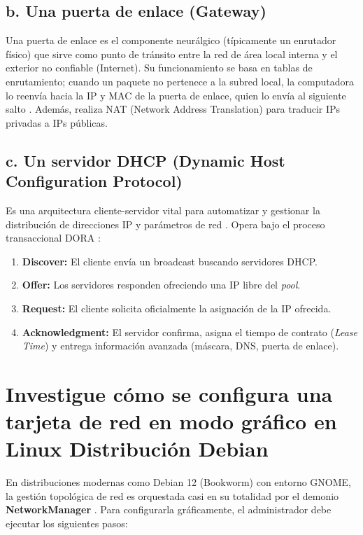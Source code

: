 \documentclass[a4paper,12pt]{article}
\begin{document}
\subsection*{b. Una puerta de enlace (Gateway)}
Una puerta de enlace es el componente neurálgico (típicamente un enrutador físico) que sirve como punto de tránsito entre la red de área local interna y el exterior no confiable (Internet). Su funcionamiento se basa en tablas de enrutamiento; cuando un paquete no pertenece a la subred local, la computadora lo reenvía hacia la IP y MAC de la puerta de enlace, quien lo envía al siguiente salto \cite{ref3}. Además, realiza NAT (Network Address Translation) para traducir IPs privadas a IPs públicas.

\subsection*{c. Un servidor DHCP (Dynamic Host Configuration Protocol)}
Es una arquitectura cliente-servidor vital para automatizar y gestionar la distribución de direcciones IP y parámetros de red \cite{ref6}. Opera bajo el proceso transaccional DORA \cite{ref3}:
\begin{enumerate}
    \item \textbf{Discover:} El cliente envía un broadcast buscando servidores DHCP.
    \item \textbf{Offer:} Los servidores responden ofreciendo una IP libre del \textit{pool}.
    \item \textbf{Request:} El cliente solicita oficialmente la asignación de la IP ofrecida.
    \item \textbf{Acknowledgment:} El servidor confirma, asigna el tiempo de contrato (\textit{Lease Time}) y entrega información avanzada (máscara, DNS, puerta de enlace).
\end{enumerate}

\section{Investigue cómo se configura una tarjeta de red en modo gráfico en Linux Distribución Debian}

En distribuciones modernas como Debian 12 (Bookworm) con entorno GNOME, la gestión topológica de red es orquestada casi en su totalidad por el demonio \textbf{NetworkManager} \cite{ref26}. Para configurarla gráficamente, el administrador debe ejecutar los siguientes pasos:
\end{document}
